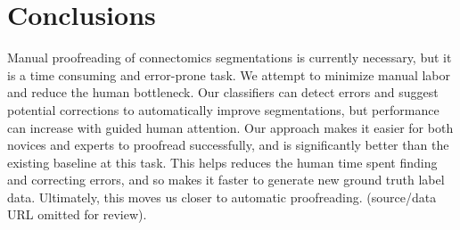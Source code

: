 \section{Conclusions}


Manual proofreading of connectomics segmentations is currently necessary, but it is a time consuming and error-prone task. We attempt to minimize manual labor and reduce the human bottleneck. Our classifiers can detect errors and suggest potential corrections to automatically improve segmentations, but performance can increase with guided human attention. Our approach makes it easier for both novices and experts to proofread successfully, and is significantly better than the existing baseline at this task. This helps reduces the human time spent finding and correcting errors, and so makes it faster to generate new ground truth label data. Ultimately, this moves us closer to automatic proofreading. (source/data URL omitted for review).%

